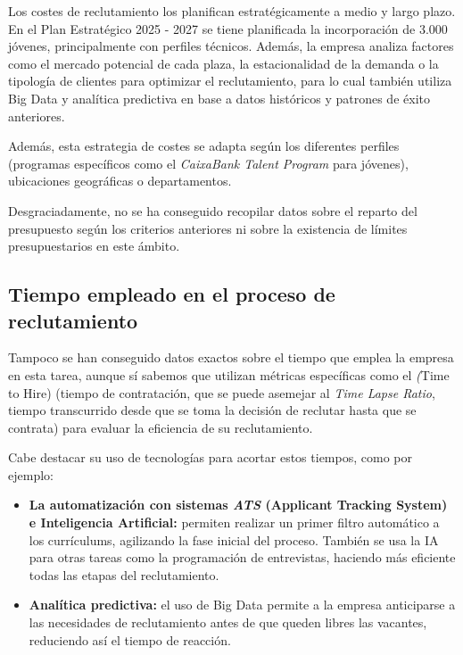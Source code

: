 Los costes de reclutamiento los planifican estratégicamente a medio y largo plazo. En el Plan Estratégico 2025 - 2027 se tiene planificada la incorporación de 3.000 jóvenes, principalmente con perfiles técnicos. Además, la empresa analiza factores como el mercado potencial de cada plaza, la estacionalidad de la demanda o la tipología de clientes para optimizar el reclutamiento, para lo cual también utiliza Big Data y analítica predictiva en base a datos históricos y patrones de éxito anteriores.

Además, esta estrategia de costes se adapta según los diferentes perfiles (programas específicos como el \textit{CaixaBank Talent Program} para jóvenes), ubicaciones geográficas o departamentos.

Desgraciadamente, no se ha conseguido recopilar datos sobre el reparto del presupuesto según los criterios anteriores ni sobre la existencia de límites presupuestarios en este ámbito.

\subsection{Tiempo empleado en el proceso de reclutamiento}

Tampoco se han conseguido datos exactos sobre el tiempo que emplea la empresa en esta tarea, aunque sí sabemos que utilizan métricas específicas como el \textit(Time to Hire) (tiempo de contratación, que se puede asemejar al \textit{Time Lapse Ratio}, tiempo transcurrido desde que se toma la decisión de reclutar hasta que se contrata) para evaluar la eficiencia de su reclutamiento.

Cabe destacar su uso de tecnologías para acortar estos tiempos, como por ejemplo:

\begin{itemize}
    \item \textbf{La automatización con sistemas \textit{ATS} (Applicant Tracking System) e Inteligencia Artificial:} permiten realizar un primer filtro automático a los currículums, agilizando la fase inicial del proceso. También se usa la IA para otras tareas como la programación de entrevistas, haciendo más eficiente todas las etapas del reclutamiento.
    \item \textbf{Analítica predictiva:} el uso de Big Data permite a la empresa anticiparse a las necesidades de reclutamiento antes de que queden libres las vacantes, reduciendo así el tiempo de reacción.
\end{itemize}


